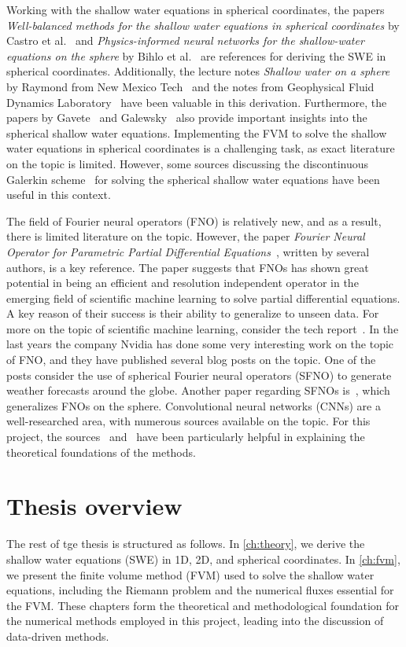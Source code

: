 Working with the shallow water equations in spherical coordinates, the papers \textit{Well-balanced methods for the shallow water equations in spherical coordinates} by Castro et al.~\cite{Castro2017} and \textit{Physics-informed neural networks for the shallow-water equations on the sphere} by Bihlo et al.~\cite{Bihlo2022} are references for deriving the SWE in spherical coordinates.
Additionally, the lecture notes \textit{Shallow water on a sphere} by Raymond from New Mexico Tech~\cite{Raymond} and the notes from Geophysical Fluid Dynamics Laboratory~\cite{shallow_water_gfdl} have been valuable in this derivation.
Furthermore, the papers by Gavete~\cite{Gavete_2009} and Galewsky~\cite{Galewsky_2004} also provide important insights into the spherical shallow water equations.
Implementing the FVM to solve the shallow water equations in spherical coordinates is a challenging task, as exact literature on the topic is limited.
However, some sources discussing the discontinuous Galerkin scheme~\cite{Hesthaven2008} for solving the spherical shallow water equations have been useful in this context.

The field of Fourier neural operators (FNO) is relatively new, and as a result, there is limited literature on the topic.
However, the paper \textit{Fourier Neural Operator for Parametric Partial Differential Equations}~\cite{FNO_2021}, written by several authors, is a key reference.
The paper suggests that FNOs has shown great potential in being an efficient and resolution independent operator in the emerging field of scientific machine learning to solve partial differential equations.
A key reason of their success is their ability to generalize to unseen data.
For more on the topic of scientific machine learning, consider the tech report~\cite{osti_1478744}.
In the last years the company Nvidia has done some very interesting work on the topic of FNO, and they have published several blog posts on the topic.
One of the posts consider the use of spherical Fourier neural operators (SFNO) to generate weather forecasts around the globe\cite{Nvidia2023}.
Another paper regarding SFNOs is~\cite{bonev2023-SFNO}, which generalizes FNOs on the sphere.
Convolutional neural networks (CNNs) are a well-researched area, with numerous sources available on the topic.
For this project, the sources~\cite{oshea2015introductionconvolutionalneuralnetworks} and~\cite{chollet2017comprehensive} have been particularly helpful in explaining the theoretical foundations of the methods.

\section{Thesis overview}
The rest of tge thesis is structured as follows.
In \autoref{ch:theory}, we derive the shallow water equations (SWE) in 1D, 2D, and spherical coordinates.
In \autoref{ch:fvm}, we present the finite volume method (FVM) used to solve the shallow water equations, including the Riemann problem and the numerical fluxes essential for the FVM.
These chapters form the theoretical and methodological foundation for the numerical methods employed in this project, leading into the discussion of data-driven methods.

